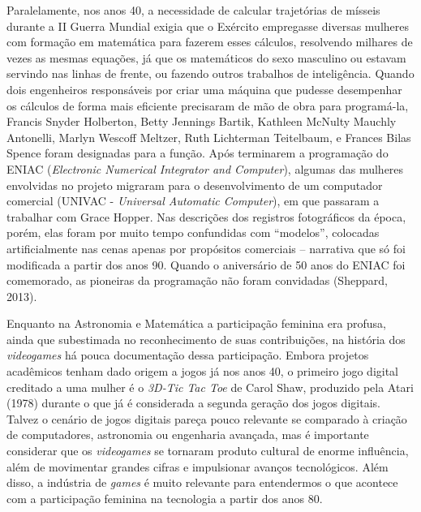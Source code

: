Paralelamente, nos anos 40, a necessidade de calcular trajetórias de mísseis durante a II Guerra Mundial exigia que o Exército empregasse diversas mulheres com formação em matemática para fazerem esses cálculos, resolvendo milhares de vezes as mesmas equações, já que os matemáticos do sexo masculino ou estavam servindo nas linhas de frente, ou fazendo outros trabalhos de inteligência. Quando dois engenheiros responsáveis por criar uma máquina que pudesse desempenhar os cálculos de forma mais eficiente precisaram de mão de obra para programá-la, Francis Snyder Holberton, Betty Jennings Bartik, Kathleen McNulty Mauchly Antonelli, Marlyn Wescoff Meltzer, Ruth Lichterman Teitelbaum, e Frances Bilas Spence foram designadas para a função. Após terminarem a programação do ENIAC (\textit{Electronic Numerical Integrator and Computer}), algumas das mulheres envolvidas no projeto migraram para o desenvolvimento de um computador comercial (UNIVAC - \textit{Universal Automatic Computer}), em que passaram a trabalhar com Grace Hopper. Nas descrições dos registros fotográficos da época, porém, elas foram por muito tempo confundidas com “modelos”, colocadas artificialmente nas cenas apenas por propósitos comerciais – narrativa que só foi modificada a partir dos anos 90. Quando o aniversário de 50 anos do ENIAC foi comemorado, as pioneiras da programação não foram convidadas (Sheppard, 2013).

Enquanto na Astronomia e Matemática a participação feminina era profusa, ainda que subestimada no reconhecimento de suas contribuições, na história dos \textit{videogames} há pouca documentação dessa participação. Embora projetos acadêmicos tenham dado origem a jogos já nos anos 40, o primeiro jogo digital creditado a uma mulher é o \textit{3D-Tic Tac Toe} de Carol Shaw, produzido pela Atari (1978) durante o que já é considerada a segunda geração dos jogos digitais. Talvez o cenário de jogos digitais pareça pouco relevante se comparado à criação de computadores, astronomia ou engenharia avançada, mas é importante considerar que os \textit{videogames} se tornaram produto cultural de enorme influência, além de movimentar grandes cifras e impulsionar avanços tecnológicos. Além disso, a indústria de \textit{games} é muito relevante para entendermos o que acontece com a participação feminina na tecnologia a partir dos anos 80.

